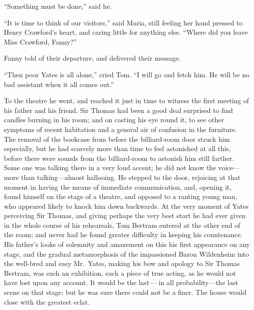 \documentclass{article}
\begin{document}
``Something must be done,'' said he.

``It is time to think of our visitors,'' said Maria,
still feeling her hand pressed to Henry Crawford's heart,
and caring little for anything else.  ``Where did you leave
Miss Crawford, Fanny?''

Fanny told of their departure, and delivered their message.

``Then poor Yates is all alone,'' cried Tom.  ``I will go
and fetch him.  He will be no bad assistant when it
all comes out.''

To the theatre he went, and reached it just in time to
witness the first meeting of his father and his friend.
Sir Thomas had been a good deal surprised to find candles
burning in his room; and on casting his eye round it,
to see other symptoms of recent habitation and a general
air of confusion in the furniture.  The removal of the
bookcase from before the billiard-room door struck
him especially, but he had scarcely more than time
to feel astonished at all this, before there were sounds
from the billiard-room to astonish him still farther.
Some one was talking there in a very loud accent; he did
not know the voice---more than talking---almost hallooing.
He stepped to the door, rejoicing at that moment in having
the means of immediate communication, and, opening it,
found himself on the stage of a theatre, and opposed
to a ranting young man, who appeared likely to knock him
down backwards.  At the very moment of Yates perceiving
Sir Thomas, and giving perhaps the very best start he
had ever given in the whole course of his rehearsals,
Tom Bertram entered at the other end of the room;
and never had he found greater difficulty in keeping
his countenance.  His father's looks of solemnity and
amazement on this his first appearance on any stage,
and the gradual metamorphosis of the impassioned Baron
Wildenheim into the well-bred and easy Mr.\ Yates,
making his bow and apology to Sir Thomas Bertram, was such
an exhibition, such a piece of true acting, as he would
not have lost upon any account.  It would be the last---%
in all probability---the last scene on that stage; but he
was sure there could not be a finer.  The house would
close with the greatest eclat.
\end{document}
